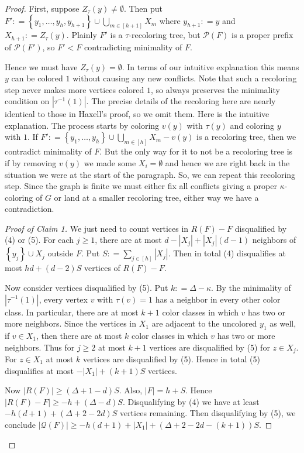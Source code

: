 \documentclass[12pt]{article}
\theoremstyle{plain}
\theoremstyle{definition}
\theoremstyle{remark}
\newcommand{\fancy}[1]{\mathcal{#1}}
\newcommand{\set}[1]{\left\{ #1 \right\}}
\newcommand{\card}[1]{\left|#1\right|}
\newcommand{\irange}[1]{\left[#1\right]}
\newcommand{\parens}[1]{\left( #1 \right)}
\newcommand{\DefinedAs}{\mathrel{\mathop:}=}
\begin{document}
\begin{proof}
First, suppose $Z_{\tau}(y) \ne \emptyset$.  Then put $F' \DefinedAs \set{y_1, \ldots, y_h, y_{h+1}} \cup \bigcup_{m \in \irange{h+1}} X_m$ where $y_{h+1} \DefinedAs y$ and $X_{h+1} \DefinedAs Z_{\tau}(y)$.  Plainly $F'$ is a $\tau$-recoloring tree, but $\fancy{P}(F)$ is a proper prefix of $\fancy{P}(F')$, so $F' < F$ contradicting minimality of $F$.

Hence we must have $Z_{\tau}(y) = \emptyset$.  In terms of our intuitive explanation this means $y$ can be colored $1$ without causing any new conflicts.  Note that such a recoloring step never makes more vertices colored $1$, so always preserves the minimality condition on $\card{\tau^{-1}(1)}$. The precise details of the recoloring here are nearly identical to those in Haxell's proof, so we omit them.  Here is the intuitive explanation. The process starts by coloring $v(y)$ with $\tau(y)$ and coloring $y$ with $1$.  If $F' \DefinedAs \set{y_1, \ldots, y_h} \cup \bigcup_{m \in \irange{h}} X_m - v(y)$ is a recoloring tree, then we contradict minimality of $F$.  But the only way for it to not be a recoloring tree is if by removing $v(y)$ we made some $X_i = \emptyset$ and hence we are right back in the situation we were at the start of the paragraph.  So, we can repeat this recoloring step.  Since the graph is finite we must either fix all conflicts giving a proper $\kappa$-coloring of $G$ or land at a smaller recoloring tree, either way we have a contradiction.

\begin{proof}[Proof of Claim 1]
We just need to count vertices in $R(F) - F$ disqualified by (4) or (5).  For each $j \ge 1$, there are at most $d - |X_j| + |X_j|(d-1)$ neighbors of $\set{y_j} \cup X_j$ outside $F$.  Put $S \DefinedAs \sum_{j \in \irange{h}} |X_j|$. Then in total (4) disqualifies at most $hd + (d-2)S$ vertices of $R(F) - F$.

Now consider vertices disqualified by (5).  Put $k \DefinedAs \Delta - \kappa$. By the minimality of $\card{\tau^{-1}(1)}$, every vertex $v$ with $\tau(v) = 1$ has a neighbor in every other color class.  In particular, there are at most $k+1$ color classes in which $v$ has two or more neighbors.  Since the vertices in $X_1$ are adjacent to the uncolored $y_1$ as well, if $v \in X_1$, then there are at most $k$ color classes in which $v$ has two or more neighbors.  Thus for $j \ge 2$ at most $k+1$ vertices are disqualified by (5) for $z \in X_j$.  For $z \in X_1$ at most $k$ vertices are disqualified by (5). Hence in total (5) disqualifies at most $-|X_1| + (k+1)S$ vertices.  

Now $\card{R(F)} \ge (\Delta + 1 - d)S$.  Also, $|F| = h + S$.  Hence $\card{R(F) - F} \ge -h + (\Delta - d)S$.  Disqualifying by (4) we have at least $-h(d+1) + (\Delta + 2 - 2d)S$ vertices remaining.  Then disqualifying by (5), we conclude $\card{\fancy{Q}(F)} \ge -h(d+1) + |X_1| + \parens{\Delta + 2 - 2d - (k+1)}S$.
\end{proof}
\end{proof}
\end{document}
